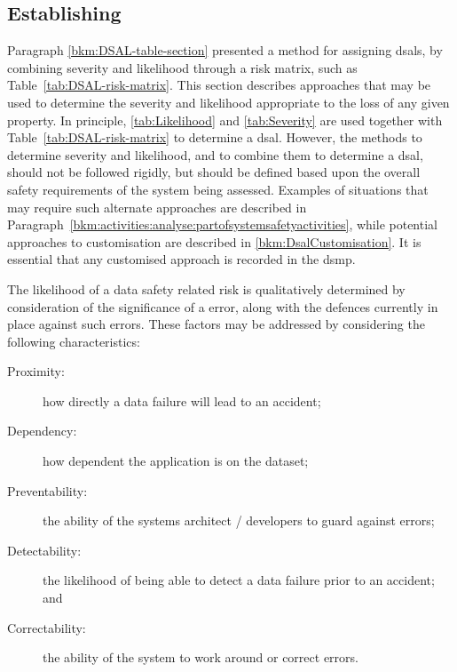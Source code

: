 \subsection{Establishing }
\label{bkm:Establishing-DSALS}
Paragraph \ref*{bkm:DSAL-table-section}
presented a method for assigning \glspl{dsal}, by combining severity and likelihood through a risk matrix, such as Table~\ref{tab:DSAL-risk-matrix}. This section describes approaches that may be used to determine the severity and likelihood appropriate to the loss of any given property. In principle, \autoref {tab:Likelihood} and \autoref{tab:Severity} are used together with Table~\ref{tab:DSAL-risk-matrix} to determine a \gls{dsal}. However, the methods to determine severity and likelihood, and to combine them to determine a \gls{dsal}, should not be followed rigidly, but should be defined based upon the overall safety requirements of the system being assessed. Examples of situations that may require such alternate approaches are described in
Paragraph~\ref{bkm:activities:analyse:partofsystemsafetyactivities},
while potential approaches to customisation are described in \autoref{bkm:DsalCustomisation}.
It is essential that any customised approach is recorded in the \gls{dsmp}.

The likelihood of a data safety related risk is qualitatively determined by
consideration of the significance of a \gls{error}, along with the defences currently in place against such errors. These factors may be addressed by
considering the following characteristics:

\begin{description}
  \item[Proximity:] how directly a data failure will lead to an accident;
  \item[Dependency:] how dependent the application is on the \gls{dataset};
  \item[Preventability:] the ability of the systems architect / developers to guard against \glspl{error};
  \item[Detectability:] the likelihood of being able to detect a data failure prior to an accident; and
  \item[Correctability:] the ability of the system to work around or correct \glspl{error}.
\end{description}

